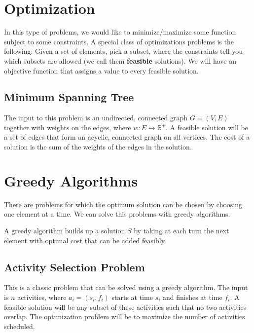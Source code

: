 \section{Optimization}

In this type of problems, we would like to minimize/maximize some
function subject to some constraints. A special class of optimizations
problems is the following: Given a set of elements, pick a subset,
where the constraints tell you which subsets are allowed (we call
them \textbf{feasible} solutions). We will have an objective
function that assigns a value to every feasible solution.

\subsection{Minimum Spanning Tree}

The input to this problem is an undirected, connected graph $G = (V,
E)$ together with weights on the edges, where $w: E \to \mathbb{R}^+$.
A feasible solution will be a set of edges that form an acyclic,
connected graph on all vertices. The cost of a solution is the sum of
the weights of the edges in the solution.

\section{Greedy Algorithms}

There are problems for which
the optimum solution can be chosen by choosing one element at a time.
We can solve this problems with greedy algorithms.

\begin{definition}
    A greedy algorithm builds up a solution $S$ by taking at each
    turn the next element with optimal cost that can be added
    feasibly.
\end{definition}

\subsection{Activity Selection Problem}

This is a classic problem that can be solved using a greedy algorithm.
The input is $n$ activities, where $a_i = (s_i, f_i)$ starts at time
$s_i$ and finishes at time $f_i$. A feasible solution will be any
subset of these activities such that no two activities overlap. The
optimization problem will be to maximize the number of activities
scheduled.

